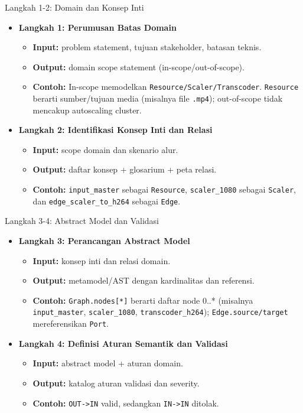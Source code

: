 \documentclass[aspectratio=169, table]{beamer}
\begin{document}
\begin{frame}{Langkah 1-2: Domain dan Konsep Inti}
\scriptsize
\begin{itemize}
  \item \textbf{Langkah 1: Perumusan Batas Domain}
  \begin{itemize}
    \item \textbf{Input:} problem statement, tujuan stakeholder, batasan teknis.
    \item \textbf{Output:} domain scope statement (in-scope/out-of-scope).
    \item \textbf{Contoh:} In-scope memodelkan \texttt{Resource/Scaler/Transcoder}. \texttt{Resource} berarti sumber/tujuan media (misalnya file \texttt{.mp4}); out-of-scope tidak mencakup autoscaling cluster.
  \end{itemize}
  \item \textbf{Langkah 2: Identifikasi Konsep Inti dan Relasi}
  \begin{itemize}
    \item \textbf{Input:} scope domain dan skenario alur.
    \item \textbf{Output:} daftar konsep + glosarium + peta relasi.
    \item \textbf{Contoh:} \texttt{input\_master} sebagai \texttt{Resource}, \texttt{scaler\_1080} sebagai \texttt{Scaler}, dan \texttt{edge\_scaler\_to\_h264} sebagai \texttt{Edge}.
  \end{itemize}
\end{itemize}
\end{frame}

\begin{frame}{Langkah 3-4: Abstract Model dan Validasi}
\scriptsize
\begin{itemize}
  \item \textbf{Langkah 3: Perancangan Abstract Model}
  \begin{itemize}
    \item \textbf{Input:} konsep inti dan relasi domain.
    \item \textbf{Output:} metamodel/AST dengan kardinalitas dan referensi.
    \item \textbf{Contoh:} \texttt{Graph.nodes[*]} berarti daftar node 0..* (misalnya \texttt{input\_master}, \texttt{scaler\_1080}, \texttt{transcoder\_h264}); \texttt{Edge.source/target} mereferensikan \texttt{Port}.
  \end{itemize}
  \item \textbf{Langkah 4: Definisi Aturan Semantik dan Validasi}
  \begin{itemize}
    \item \textbf{Input:} abstract model + aturan domain.
    \item \textbf{Output:} katalog aturan validasi dan severity.
    \item \textbf{Contoh:} \texttt{OUT->IN} valid, sedangkan \texttt{IN->IN} ditolak.
  \end{itemize}
\end{itemize}
\end{frame}
\end{document}
